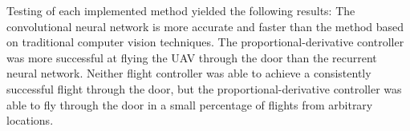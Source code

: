 Testing of each implemented method yielded the following results: The convolutional neural network is more accurate and faster than the method based on traditional computer vision techniques. The proportional-derivative controller was more successful at flying the UAV through the door than the recurrent neural network. Neither flight controller was able to achieve a consistently successful flight through the door, but the proportional-derivative controller was able to fly through the door in a small percentage of flights from arbitrary locations.
